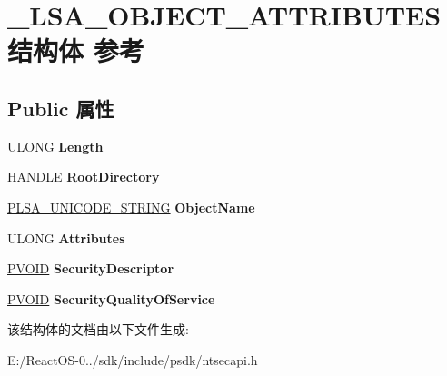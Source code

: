 \hypertarget{struct___l_s_a___o_b_j_e_c_t___a_t_t_r_i_b_u_t_e_s}{}\section{\+\_\+\+L\+S\+A\+\_\+\+O\+B\+J\+E\+C\+T\+\_\+\+A\+T\+T\+R\+I\+B\+U\+T\+E\+S结构体 参考}
\label{struct___l_s_a___o_b_j_e_c_t___a_t_t_r_i_b_u_t_e_s}
\subsection*{Public 属性}
\begin{DoxyCompactItemize}
\item 
\mbox{\label{struct___l_s_a___o_b_j_e_c_t___a_t_t_r_i_b_u_t_e_s_a68e4f7ef6e3b89b9294ac48eaed15fd0}} 
U\+L\+O\+NG {\bfseries Length}
\item 
\mbox{\label{struct___l_s_a___o_b_j_e_c_t___a_t_t_r_i_b_u_t_e_s_a4f030d2a8d48d2a4f09b660eba38c67b}} 
\hyperlink{interfacevoid}{H\+A\+N\+D\+LE} {\bfseries Root\+Directory}
\item 
\mbox{\label{struct___l_s_a___o_b_j_e_c_t___a_t_t_r_i_b_u_t_e_s_aae6ec1659d375b110a8a7373c6cacd35}} 
\hyperlink{struct___l_s_a___u_n_i_c_o_d_e___s_t_r_i_n_g}{P\+L\+S\+A\+\_\+\+U\+N\+I\+C\+O\+D\+E\+\_\+\+S\+T\+R\+I\+NG} {\bfseries Object\+Name}
\item 
\mbox{\label{struct___l_s_a___o_b_j_e_c_t___a_t_t_r_i_b_u_t_e_s_a8b7a3db04b95d469e482b7308c9d2716}} 
U\+L\+O\+NG {\bfseries Attributes}
\item 
\mbox{\label{struct___l_s_a___o_b_j_e_c_t___a_t_t_r_i_b_u_t_e_s_a5f77fc8fe18413c941333594349b3e98}} 
\hyperlink{interfacevoid}{P\+V\+O\+ID} {\bfseries Security\+Descriptor}
\item 
\mbox{\label{struct___l_s_a___o_b_j_e_c_t___a_t_t_r_i_b_u_t_e_s_a21445562eac52114e4956f1962d3826d}} 
\hyperlink{interfacevoid}{P\+V\+O\+ID} {\bfseries Security\+Quality\+Of\+Service}
\end{DoxyCompactItemize}


该结构体的文档由以下文件生成\+:\begin{DoxyCompactItemize}
\item 
E\+:/\+React\+O\+S-\/0../sdk/include/psdk/ntsecapi.\+h\end{DoxyCompactItemize}
